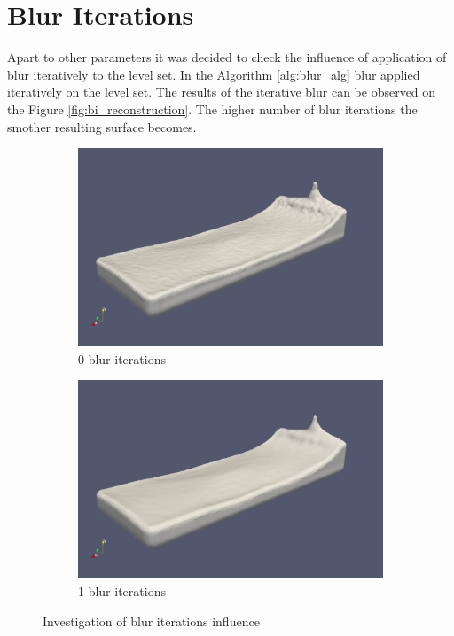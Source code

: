 \section{Blur Iterations}
Apart to other parameters it was decided to check the influence of application of blur iteratively to the level set. In the Algorithm \ref{alg:blur_alg} blur applied iteratively on the level set. The results of the iterative blur can be observed on the Figure \ref{fig:bi_reconstruction}. The higher number of blur iterations the smother resulting surface becomes. 
\begin{figure}
        \begin{subfigure}[b]{\textwidth}
               \includegraphics[width=\textwidth]{figures/ReconstructionIterations0.png}
				\caption{0 blur iterations}
               \label{fig:bi_original}
        \end{subfigure}
        \begin{subfigure}[b]{\textwidth}
               \includegraphics[width=\textwidth]{figures/ReconstructionIterations1.png}
				\caption{1 blur iterations}

				\label{fig:bi_1iteration}
        \end{subfigure}
       \caption{Investigation of blur iterations influence}
       \label{fig:bi_reconstruction1}

\end{figure}

